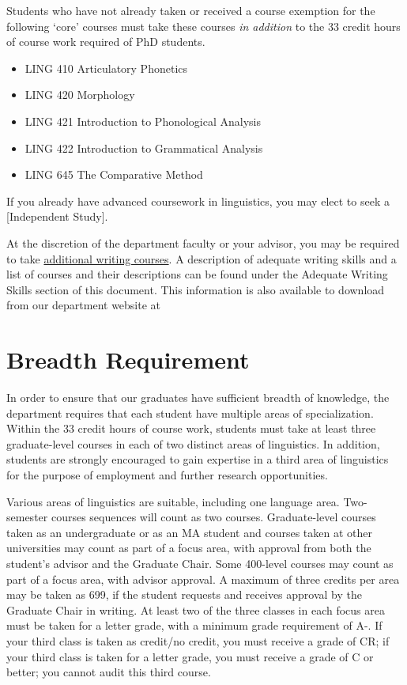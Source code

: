 \documentclass[
]{book}
\providecommand{\tightlist}{%
  \setlength{\itemsep}{0pt}\setlength{\parskip}{0pt}}
\begin{document}
Students who have not already taken or received a course exemption for the following `core' courses must take these courses \emph{in addition} to the 33 credit hours of course work required of PhD students.

\begin{itemize}
\tightlist
\item
  LING 410 Articulatory Phonetics
\item
  LING 420 Morphology
\item
  LING 421 Introduction to Phonological Analysis
\item
  LING 422 Introduction to Grammatical Analysis
\item
  LING 645 The Comparative Method
\end{itemize}

If you already have advanced coursework in linguistics, you may elect to seek a {[}Independent Study{]}.

At the discretion of the department faculty or your advisor, you may be required to take \href{writing}{additional writing courses}. A description of adequate writing skills and a list of courses and their descriptions can be found under the Adequate Writing Skills section of this document. This information is also available to download from our department website at

\hypertarget{breadth-requirement}{%
\section{Breadth Requirement}\label{breadth-requirement}}

In order to ensure that our graduates have sufficient breadth of knowledge, the department requires that each student have multiple areas of specialization. Within the 33 credit hours of course work, students must take at least three graduate-level courses in each of two distinct areas of linguistics. In addition, students are strongly encouraged to gain expertise in a third area of linguistics for the purpose of employment and further research opportunities.

Various areas of linguistics are suitable, including one language area. Two-semester courses sequences will count as two courses. Graduate-level courses taken as an undergraduate or as an MA student and courses taken at other universities may count as part of a focus area, with approval from both the student's advisor and the Graduate Chair. Some 400-level courses may count as part of a focus area, with advisor approval. A maximum of three credits per area may be taken as 699, if the student requests and receives approval by the Graduate Chair in writing. At least two of the three classes in each focus area must be taken for a letter grade, with a minimum grade requirement of A-. If your third class is taken as credit/no credit, you must receive a grade of CR; if your third class is taken for a letter grade, you must receive a grade of C or better; you cannot audit this third course.
\end{document}
